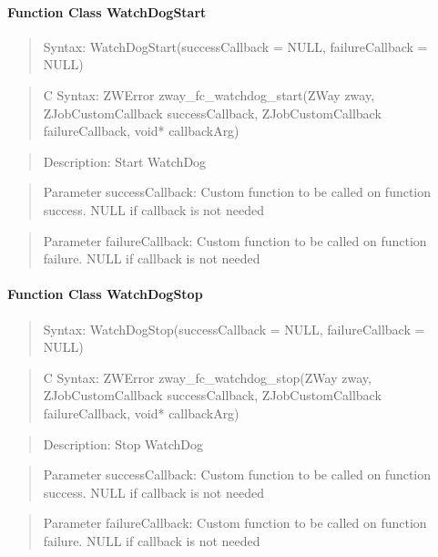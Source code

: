 \paragraph{Function Class WatchDogStart}
\begin{quote}Syntax: WatchDogStart(successCallback = NULL, failureCallback = NULL)\end{quote}
\begin{quote}C Syntax: ZWError zway\_fc\_watchdog\_start(ZWay zway, ZJobCustomCallback successCallback, ZJobCustomCallback failureCallback, void* callbackArg)\end{quote}
\begin{quote}Description: Start WatchDog\end{quote}
\begin{quote}Parameter successCallback: Custom function to be called on function success. NULL if callback is not needed\end{quote}
\begin{quote}Parameter failureCallback: Custom function to be called on function failure. NULL if callback is not needed\end{quote}


\paragraph{Function Class WatchDogStop}
\begin{quote}Syntax: WatchDogStop(successCallback = NULL, failureCallback = NULL)\end{quote}
\begin{quote}C Syntax: ZWError zway\_fc\_watchdog\_stop(ZWay zway, ZJobCustomCallback successCallback, ZJobCustomCallback failureCallback, void* callbackArg)\end{quote}
\begin{quote}Description: Stop WatchDog\end{quote}
\begin{quote}Parameter successCallback: Custom function to be called on function success. NULL if callback is not needed\end{quote}
\begin{quote}Parameter failureCallback: Custom function to be called on function failure. NULL if callback is not needed\end{quote}


